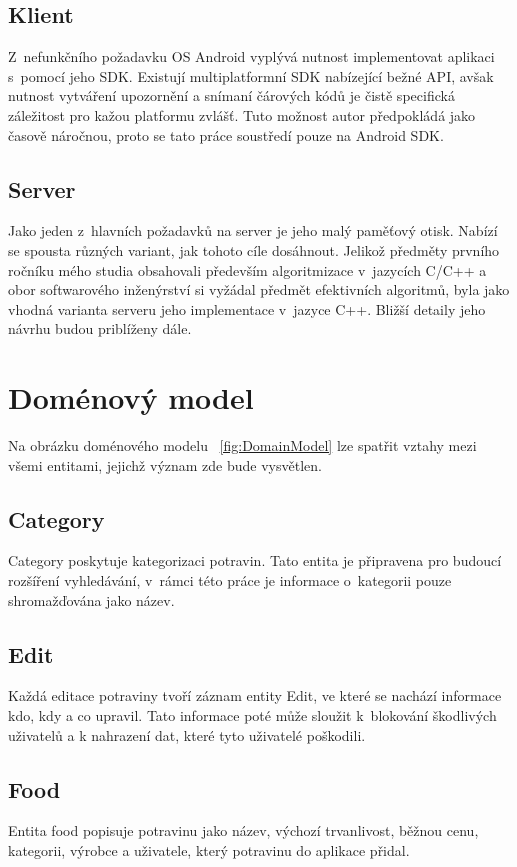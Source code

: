 \documentclass[thesis=B,czech]{FITthesis}[2013/10/20]
\begin{document}
\subsection{Klient}

Z~nefunkčního požadavku OS Android vyplývá nutnost implementovat aplikaci s~pomocí jeho SDK. Existují multiplatformní SDK nabízející bežné API, avšak nutnost vytváření upozornění a snímaní čárových kódů je čistě specifická záležitost pro kažou platformu zvlášť. Tuto možnost autor předpokládá jako časově náročnou, proto se tato práce soustředí pouze na Android SDK.

\subsection{Server}

Jako jeden z~hlavních požadavků na server je jeho malý paměťový otisk. Nabízí se spousta různých variant, jak tohoto cíle dosáhnout. Jelikož předměty prvního ročníku mého studia obsahovali především algoritmizace v~jazycích C/C++ a obor softwarového inženýrství si vyžádal předmět efektivních algoritmů, byla jako vhodná varianta serveru jeho implementace v~jazyce C++. Bližší detaily jeho návrhu budou priblíženy dále.

\section{Doménový model}

Na obrázku doménového modelu ~\ref{fig:DomainModel} lze spatřit vztahy mezi všemi entitami, jejichž význam zde bude vysvětlen.

\subsection{Category}
Category poskytuje kategorizaci potravin. Tato entita je připravena pro budoucí rozšíření vyhledávání, v~rámci této práce je informace o~kategorii pouze shromažďována jako název.

\subsection{Edit}
Každá editace potraviny tvoří záznam entity Edit, ve které se nachází informace kdo, kdy a co upravil. Tato informace poté může sloužit k~blokování škodlivých uživatelů a k nahrazení dat, které tyto uživatelé poškodili.

\subsection{Food}
Entita food popisuje potravinu jako název, výchozí trvanlivost, běžnou cenu, kategorii, výrobce a uživatele, který potravinu do aplikace přidal.
\end{document}
